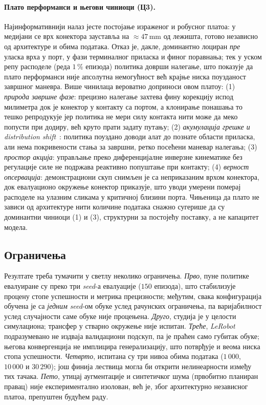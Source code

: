 \documentclass[12pt, a4paper]{article}
\begin{document}
\paragraph{Плато перформанси и његови чиниоци (Ц3).}
Најинформативнији налаз јесте постојање израженог и робусног платоа: у медијани се врх конектора зауставља на $\approx 47$\,mm од лежишта, готово независно од архитектуре и обима података.
Отказ је, дакле, доминантно лоциран \emph{пре} уласка врха у порт, у фази терминалног приласка и финог поравнања; тек у уском репу расподеле (реда $1\,\%$ епизода) политика доврши налегање, што показује да плато перформанси није апсолутна немогућност већ крајње ниска поузданост завршног маневра.
Више чинилаца вероватно доприноси овом платоу:
(1) \emph{природа завршне фазе}: прецизно налегање захтева фину корекцију испод милиметра док је конектор у контакту са портом, а клонирање понашања то тешко репродукује јер политика не мери силу контакта нити може да меко попусти при додиру, већ круто прати задату путању;
(2) \emph{акумулација грешке и distribution shift}~\cite{ross2011dagger}: политика поуздано доводи алат до познате области приласка, али нема покривености стања за завршни, ретко посећени маневар налегања;
(3) \emph{простор акција}: управљање преко диференцијалне инверзне кинематике без регулације силе не подржава реактивно попуштање при контакту;
(4) \emph{верност опсервација}: демонстрациони скуп снимљен је са неприказаним врхом конектора, док евалуационо окружење конектор приказује, што уводи умерени померај расподеле на улазним сликама у критичној близини порта.
Чињеница да плато не зависи од архитектуре нити количине података снажно сугерише да су доминантни чиниоци (1) и (3), структурни за постојећу поставку, а не капацитет модела.

\subsection{Ограничења}

Резултате треба тумачити у светлу неколико ограничења.
\emph{Прво}, пуне политике евалуиране су преко три \textit{seed}-а евалуације ($150$ епизода), што стабилизује процену стопе успешности и метрика прецизности; међутим, свака конфигурација обучена је са \emph{једним} \textit{seed}-ом обуке услед рачунских ограничења, па варијабилност услед случајности саме обуке није процењена.
\emph{Друго}, студија је у целости симулациона; трансфер у стварно окружење није испитан.
\emph{Треће}, \textit{LeRobot} подразумевано не издваја валидациони подскуп, па је праћен само губитак обуке; његова конвергенција не имплицира генерализацију, што потврђује и веома ниска стопа успешности.
\emph{Четврто}, испитана су три нивоа обима података ($1\,000$, $10\,000$ и $30\,290$); још финија лествица могла би открити нелинеарности између тих тачака.
\emph{Пето}, утицај аугментације и синтетичког шума (првобитно планиран правац) није експериментално изолован, већ је, због архитектурно независног платоа, препуштен будућем раду.
\end{document}
